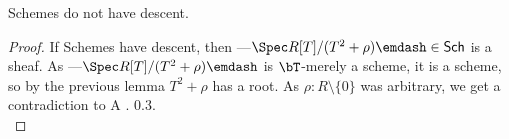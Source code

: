 \begin{corollary}
	Schemes do not have descent.
\end{corollary}
\begin{proof}
	If Schemes have descent, then ---$\Spec R[T]/(T^2 + \rho) \emdash \in \mathsf{Sch}$ is a sheaf. As ---$\Spec R[T]/(T^2 + \rho) \emdash$ is $\bT$-merely a scheme, it is a scheme, so by the previous lemma $T^2 + \rho$ has a root. As $\rho : R \setminus \{0\}$ was arbitrary, we get a contradiction to \cite{cherubini2023foundationsyntheticalgebraicgeometry} A . 0.3. \\
\end{proof}